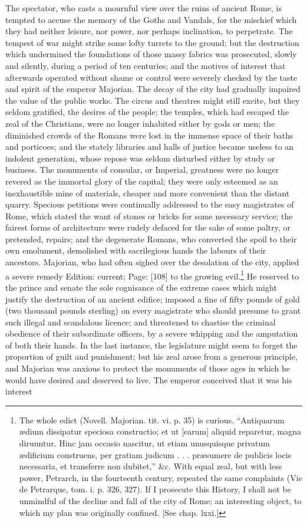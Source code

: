 The spectator, who casts a mournful view over the ruins of ancient Rome, is tempted to accuse the memory of the Goths and Vandals, for the mischief which they had neither leisure, nor power, nor perhaps inclination, to perpetrate. The tempest of war might strike some lofty turrets to the ground; but the destruction which undermined the foundations of those massy fabrics was prosecuted, slowly and silently, during a period of ten centuries; and the motives of interest that afterwards operated without shame or control were severely checked by the taste and spirit of the emperor Majorian. The decay of the city had gradually impaired the value of the public works. The circus and theatres might still excite, but they seldom gratified, the desires of the people; the temples, which had escaped the zeal of the Christians, were no longer inhabited either by gods or men; the diminished crowds of the Romans were lost in the immense space of their baths and porticoes; and the stately libraries and halls of justice became useless to an indolent generation, whose repose was seldom disturbed either by study or business. The monuments of consular, or Imperial, greatness were no longer revered as the immortal glory of the capital; they were only esteemed as an inexhaustible mine of materials, cheaper and more convenient than the distant quarry. Specious petitions were continually addressed to the easy magistrates of Rome, which stated the want of stones or bricks for some necessary service; the fairest forms of architecture were rudely defaced for the sake of some paltry, or pretended, repairs; and the degenerate Romans, who converted the spoil to their own emolument, demolished with sacrilegious hands the labours of their ancestors. Majorian, who had often sighed over the desolation of the city, applied a severe remedy Edition: current; Page: [108] to the growing evil.\footnote{The whole edict (Novell. Majorian. tit. vi. p. 35) is curious. \texthebrew{“}Antiquarum ædium dissipatur speciosa constructio; et ut [earum] aliquid reparetur, magna diruuntur. Hinc jam occasio nascitur, ut etiam unusquisque privatum ædificium construens, per gratiam judicum . . . præsumere de publicis locis necessaria, et transferre non dubitet,\texthebrew{}” \&c. With equal zeal, but with less power, Petrarch, in the fourteenth century, repeated the same complaints (Vie de Petrarque, tom. i. p. 326, 327). If I prosecute this History, I shall not be unmindful of the decline and fall of the city of Rome; an interesting object, to which my plan was originally confined. [See chap. lxxi.]} He reserved to the prince and senate the sole cognisance of the extreme cases which might justify the destruction of an ancient edifice; imposed a fine of fifty pounds of gold (two thousand pounds sterling) on every magistrate who should presume to grant such illegal and scandalous licence; and threatened to chastise the criminal obedience of their subordinate officers, by a severe whipping and the amputation of both their hands. In the last instance, the legislature might seem to forget the proportion of guilt and punishment; but his zeal arose from a generous principle, and Majorian was anxious to protect the monuments of those ages in which he would have desired and deserved to live. The emperor conceived that it was his interest 